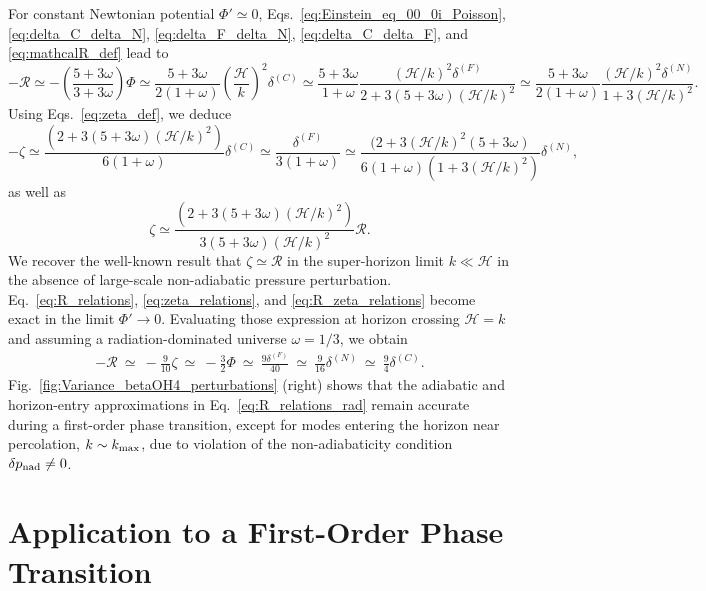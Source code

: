 \documentclass[twocolumn,superscriptaddress,aps,preprintnumbers,amsmath,amssymb,prl,footinbib]{revtex4-2}
\begin{document}
For constant Newtonian potential $\Phi'\simeq 0$, Eqs.~\eqref{eq:Einstein_eq_00_0i_Poisson}, \eqref{eq:delta_C_delta_N}, \eqref{eq:delta_F_delta_N}, \eqref{eq:delta_C_delta_F}, and \eqref{eq:mathcalR_def}  lead to
\begin{equation}
\label{eq:R_relations}
-\mathcal{R}\simeq -\left( \frac{5+3\omega}{3+3\omega} \right)\Phi \simeq  \frac{5+3\omega}{2(1+\omega)}\left(\frac{\mathcal{H}}{k}\right)^2\delta^{(C)}\simeq\frac{5+3\omega}{1+\omega}\frac{\left(\mathcal{H}/k\right)^2\delta^{(F)}}{2+3(5+3\omega)(\mathcal{H}/k)^2}\simeq\frac{5+3\omega}{2(1+\omega)}\frac{\left(\mathcal{H}/k\right)^2\delta^{(N)}}{1+3(\mathcal{H}/k)^2}.
\end{equation}
Using Eqs.~\eqref{eq:zeta_def}, we deduce
\begin{equation}
\label{eq:zeta_relations}
-\zeta  \simeq  \frac{(2+3(5+3\omega)(\mathcal{H}/k)^2)}{6(1+\omega)}\delta^{(C)}\simeq \frac{\delta^{(F)}}{3(1+\omega)}\simeq\frac{(2+3(\mathcal{H}/k)^2(5+3\omega)}{6(1+\omega)(1+3(\mathcal{H}/k)^2)}\delta^{(N)},
\end{equation}
as well as
\begin{equation}
\label{eq:R_zeta_relations}
    \zeta \simeq  \frac{(2+3(5+3\omega)(\mathcal{H}/k)^2)}{3(5+3\omega)(\mathcal{H}/k)^2}\mathcal{R}.
\end{equation}
We recover the well-known result that $\zeta \simeq \mathcal{R}$ in the super-horizon limit $k\ll \mathcal{H}$ in the absence of large-scale non-adiabatic pressure perturbation.
Eq.~\eqref{eq:R_relations}, \eqref{eq:zeta_relations}, and \eqref{eq:R_zeta_relations} become exact in the limit $\Phi' \to 0$.
Evaluating those expression at horizon crossing $\mathcal{H}=k$ and assuming a radiation-dominated universe $\omega=1/3$, we obtain
\begin{align}
\label{eq:R_relations_rad}
 -\mathcal{R}~\simeq~ -\frac{9}{10}\zeta~\simeq~ -\frac{3}{2}\Phi~ \simeq  ~ \frac{9\delta^{(F)}}{40}~\simeq~ \frac{9}{16}\delta^{(N)}~ \simeq ~ \frac{9}{4}\delta^{(C)} .
\end{align}
Fig.~\ref{fig:Variance_betaOH4_perturbations} (right) shows that the adiabatic and horizon-entry approximations in Eq.~\eqref{eq:R_relations_rad} remain accurate during
a first-order phase transition, except for modes entering the horizon near
percolation, $k \sim k_{\rm max}$, due to violation of the non-adiabaticity condition $\delta p_{\rm nad}\neq 0$.



\section{Application to a First-Order Phase Transition}
\label{app:Bubble_growth_theory}
\end{document}
